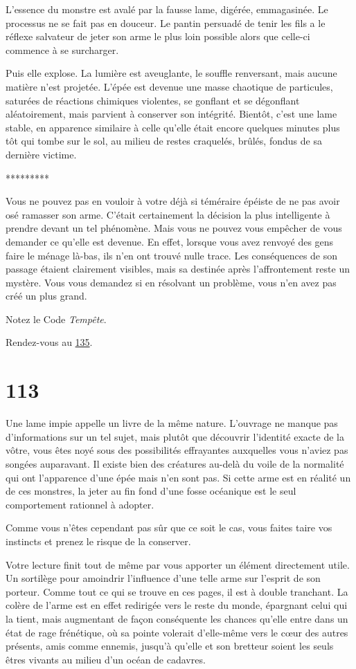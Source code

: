 \documentclass{report}
\newcommand{\gsection}[1]{
    \section{#1}
    \label{section-#1}
}
\newcommand{\glink}[1]{\hyperref[section-#1]{#1}}
\newcommand{\ellipse}{
    \begin{center}
        *********
    \end{center}
}
\begin{document}
L'essence du monstre est avalé par la fausse lame, digérée, emmagasinée. Le processus ne se fait pas en douceur. Le pantin persuadé de tenir les fils a le réflexe salvateur de jeter son arme le plus loin possible alors que celle-ci commence à se surcharger.

Puis elle explose. La lumière est aveuglante, le souffle renversant, mais aucune matière n'est projetée. L'épée est devenue une masse chaotique de particules, saturées de réactions chimiques violentes, se gonflant et se dégonflant aléatoirement, mais parvient à conserver son intégrité. Bientôt, c'est une lame stable, en apparence similaire à celle qu'elle était encore quelques minutes plus tôt qui tombe sur le sol, au milieu de restes craquelés, brûlés, fondus de sa dernière victime.

\ellipse

Vous ne pouvez pas en vouloir à votre déjà si téméraire épéiste de ne pas avoir osé ramasser son arme. C'était certainement la décision la plus intelligente à prendre devant un tel phénomène. Mais vous ne pouvez vous empêcher de vous demander ce qu'elle est devenue.
En effet, lorsque vous avez renvoyé des gens faire le ménage là-bas, ils n'en ont trouvé nulle trace. Les conséquences de son passage étaient clairement visibles, mais sa destinée après l'affrontement reste un mystère. Vous vous demandez si en résolvant un problème, vous n'en avez pas créé un plus grand.

Notez le Code \emph{Tempête}.

Rendez-vous au \glink{135}.

\gsection{113}

Une lame impie appelle un livre de la même nature. L'ouvrage ne manque pas d'informations sur un tel sujet, mais plutôt que découvrir l'identité exacte de la vôtre, vous êtes noyé sous des possibilités effrayantes auxquelles vous n'aviez pas songées auparavant. Il existe bien des créatures au-delà du voile de la normalité qui ont l'apparence d'une épée mais n'en sont pas. Si cette arme est en réalité un de ces monstres, la jeter au fin fond d'une fosse océanique est le seul comportement rationnel à adopter.

Comme vous n'êtes cependant pas sûr que ce soit le cas, vous faites taire vos instincts et prenez le risque de la conserver.

Votre lecture finit tout de même par vous apporter un élément directement utile. Un sortilège pour amoindrir l'influence d'une telle arme sur l'esprit de son porteur. Comme tout ce qui se trouve en ces pages, il est à double tranchant. La colère de l'arme est en effet redirigée vers le reste du monde, épargnant celui qui la tient, mais augmentant de façon conséquente les chances qu'elle entre dans un état de rage frénétique, où sa pointe volerait d'elle-même vers le cœur des autres présents, amis comme ennemis, jusqu'à qu'elle et son bretteur soient les seuls êtres vivants au milieu d'un océan de cadavres.
\end{document}
